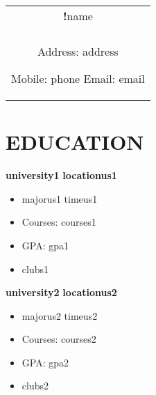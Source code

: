 \documentclass[a4paper,8pt]{article}
\begin{document}
    \pagestyle{empty}
    
    
    \begin{tabularx}{\linewidth}{@{} C @{}}
    \Huge\textbf !name \\[6pt]
    \\
    Address: {{address}}
    
    Mobile: {{phone}}
    Email: {{email}}
    \end{tabularx}
    
    \section{EDUCATION}
    \textbf {{university1}} \hfill \textbf {{locationus1}} \\[-3ex]
    \begin{itemize}[label={\large\textbullet}, left=0pt, itemsep=0.5ex, parsep=0.5ex]
        \item {{majorus1}} \hfill {{timeus1}} \\[-3ex]
    \end{itemize}
    \begin{itemize}[label=$\circ$,itemsep=0.5ex,parsep=0.5ex]
        \item Courses: {{courses1}}
        \item GPA: {{gpa1}}
        \item {{clubs1}}
    \end{itemize}
    
    \textbf {{university2}} \hfill \textbf {{locationus2}} \\[-3ex]
    \begin{itemize}[label={\large\textbullet}, left=0pt, itemsep=0.5ex, parsep=0.5ex]
        \item {{majorus2}} \hfill  {{timeus2}} \\[-3ex]
    \end{itemize}
    \begin{itemize}[label=$\circ$,itemsep=0.5ex,parsep=0.5ex]
        \item Courses: {{courses2}}
        \item GPA: {{gpa2}}
        \item {{clubs2}}
    \end{itemize}
    
\end{document}
